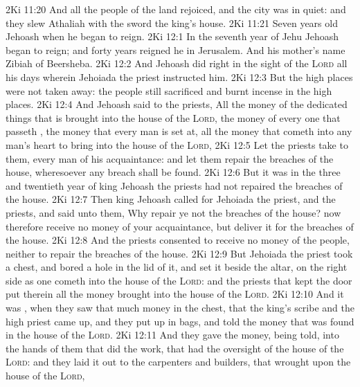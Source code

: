 \vs 2Ki 11:20 And all the people of the land rejoiced, and the city was in quiet: and they slew Athaliah with the sword  the king's house.
\vs 2Ki 11:21 Seven years old  Jehoash when he began to reign.
\vs 2Ki 12:1 In the seventh year of Jehu Jehoash began to reign; and forty years reigned he in Jerusalem. And his mother's name  Zibiah of Beersheba.
\vs 2Ki 12:2 And Jehoash did  right in the sight of the \textsc{Lord} all his days wherein Jehoiada the priest instructed him.
\vs 2Ki 12:3 But the high places were not taken away: the people still sacrificed and burnt incense in the high places.
\vs 2Ki 12:4 And Jehoash said to the priests, All the money of the dedicated things that is brought into the house of the \textsc{Lord},  the money of every one that passeth , the money that every man is set at,  all the money that cometh into any man's heart to bring into the house of the \textsc{Lord},
\vs 2Ki 12:5 Let the priests take  to them, every man of his acquaintance: and let them repair the breaches of the house, wheresoever any breach shall be found.
\vs 2Ki 12:6 But it was  in the three and twentieth year of king Jehoash the priests had not repaired the breaches of the house.
\vs 2Ki 12:7 Then king Jehoash called for Jehoiada the priest, and the  priests, and said unto them, Why repair ye not the breaches of the house? now therefore receive no  money of your acquaintance, but deliver it for the breaches of the house.
\vs 2Ki 12:8 And the priests consented to receive no  money of the people, neither to repair the breaches of the house.
\vs 2Ki 12:9 But Jehoiada the priest took a chest, and bored a hole in the lid of it, and set it beside the altar, on the right side as one cometh into the house of the \textsc{Lord}: and the priests that kept the door put therein all the money  brought into the house of the \textsc{Lord}.
\vs 2Ki 12:10 And it was , when they saw that  much money in the chest, that the king's scribe and the high priest came up, and they put up in bags, and told the money that was found in the house of the \textsc{Lord}.
\vs 2Ki 12:11 And they gave the money, being told, into the hands of them that did the work, that had the oversight of the house of the \textsc{Lord}: and they laid it out to the carpenters and builders, that wrought upon the house of the \textsc{Lord},
